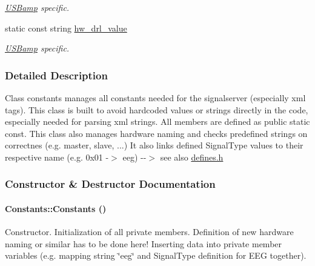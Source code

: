 \begin{DoxyCompactItemize}
\begin{DoxyCompactList}\small\item\em \hyperlink{class_u_s_bamp}{USBamp} specific. \item\end{DoxyCompactList}\item 
\hypertarget{class_constants_ad51c0dee8250fa2871cbe41fd4a35f0a}{
static const string \hyperlink{class_constants_ad51c0dee8250fa2871cbe41fd4a35f0a}{hw\_\-drl\_\-value}}
\label{class_constants_ad51c0dee8250fa2871cbe41fd4a35f0a}

\begin{DoxyCompactList}\small\item\em \hyperlink{class_u_s_bamp}{USBamp} specific. \item\end{DoxyCompactList}\end{DoxyCompactItemize}


\subsubsection{Detailed Description}
Class constants manages all constants needed for the signalserver (especially xml tags). This class is built to avoid hardcoded values or strings directly in the code, especially needed for parsing xml strings. All members are defined as public static const. This class also manages hardware naming and checks predefined strings on correctnes (e.g. master, slave, ...) It also links defined SignalType values to their respective name (e.g. 0x01 -\/$>$ eeg) -\/-\/$>$ see also \hyperlink{defines_8h}{defines.h} 

\subsubsection{Constructor \& Destructor Documentation}
\hypertarget{class_constants_af395b3c1d6f0577f4880a21a257aa1db}{
\paragraph[{Constants}]{\setlength{\rightskip}{0pt plus 5cm}Constants::Constants ()}\hfill}
\label{class_constants_af395b3c1d6f0577f4880a21a257aa1db}


Constructor. Initialization of all private members. Definition of new hardware naming or similar has to be done here! Inserting data into private member variables (e.g. mapping string \char`\"{}eeg\char`\"{} and SignalType definition for EEG together). 

